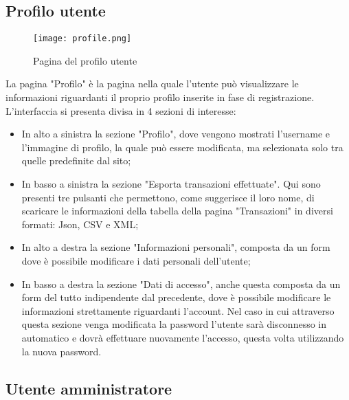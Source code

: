 \documentclass[binding=0.6cm, oneside, noexaminfo, italian]{sapthesis}
\begin{document}
\subsection{Profilo utente}
\begin{figure}[h]
    \centering
    \texttt{[image: profile.png]}
    \caption{Pagina del profilo utente}
    \label{fig:profile}
\end{figure}
La pagina "Profilo" è la pagina nella quale l'utente può visualizzare le informazioni riguardanti il proprio profilo inserite in fase di registrazione. L'interfaccia si presenta divisa in 4 sezioni di interesse:
\begin{itemize}
    \item In alto a sinistra la sezione "Profilo", dove vengono mostrati l'username e l'immagine di profilo, la quale può essere modificata, ma selezionata solo tra quelle predefinite dal sito;
    \item In basso a sinistra la sezione "Esporta transazioni effettuate". Qui sono presenti tre pulsanti che permettono, come suggerisce il loro nome, di scaricare le informazioni della tabella della pagina "Transazioni" in diversi formati: Json, CSV e XML;
    \item In alto a destra la sezione "Informazioni personali", composta da un form dove è possibile modificare i dati personali dell'utente;
    \item In basso a destra la sezione "Dati di accesso", anche questa composta da un form del tutto indipendente dal precedente, dove è possibile modificare le informazioni strettamente riguardanti l'account. Nel caso in cui attraverso questa sezione venga modificata la password l'utente sarà disconnesso in automatico e dovrà effettuare nuovamente l'accesso, questa volta utilizzando la nuova password.
\end{itemize}
\subsection{Utente amministratore}
\end{document}
